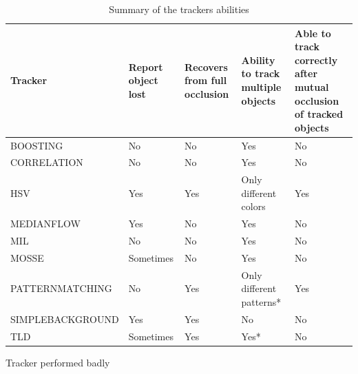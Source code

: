 \begin{landscape}
\begin{table}
\centering
\begin{tabular}{p{5cm}|p{3cm}|p{4cm}|p{5cm}|p{5cm}}
Tracker & Report object lost & Recovers from full occlusion & Ability to track multiple objects & Able to track correctly after mutual occlusion of tracked objects \\
\hline
BOOSTING & No & No & Yes & No \\
CORRELATION & No & No & Yes & No \\
HSV & Yes & Yes & Only different colors & Yes \\
MEDIANFLOW & Yes & No & Yes & No \\
MIL & No & No  & Yes & No \\
MOSSE & Sometimes & No & Yes & No \\
PATTERNMATCHING & No & Yes & Only different patterns* & Yes \\
SIMPLEBACKGROUND & Yes & Yes & No & No \\
TLD & Sometimes & Yes & Yes* & No \\
\end{tabular}
\vspace{1ex}
\raggedright *Tracker performed badly
\caption{Summary of the trackers abilities}
\label{table:occlusion-multiple}
\end{table}
\end{landscape}

